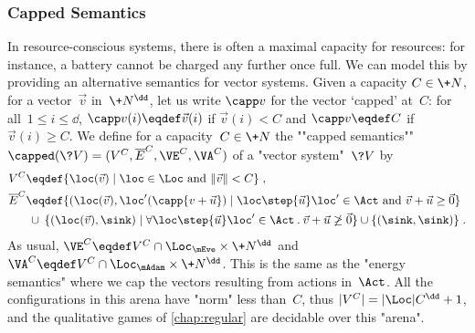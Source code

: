 \subsubsection{Capped Semantics}
\label{12-capping}

In resource-conscious systems, there is often a maximal capacity for
resources: for instance, a battery cannot be charged any further once
full.  We can model this by providing an alternative semantics
for vector systems.  Given a capacity $C\in\+N$, for a vector~$\vec v$
in~$\+N^\dd$, let us write $\capp v$ for the vector `capped' at~$C$:
for all~$1\leq i\leq\dd$, $\capp v(i)\eqdef\vec v(i)$ if $\vec v(i)<C$
and $\capp v\eqdef C$ if $\vec v(i)\geq C$.  We define for a
capacity~$C\in\+N$ the ""capped semantics""
$\capped(\?V)=(V^C,\overline{E}^C,\VE^C,\VA^C)$ of a "vector system"~$\?V$ by
\begin{align*}
  V^C&\eqdef\{\loc(\vec v)\mid\loc\in\Loc\text{ and }\|\vec v\|<C\}\;,\\
  \overline{E}^C&\eqdef \{(\loc(\vec v),\loc'(\capp{v+\vec u})\mid\loc\step{\vec
       u}\loc'\in\Act\text{ and }\vec v+\vec u\geq\vec 0\}\\
     &\:\cup\:\{(\loc(\vec v),\sink)\mid\forall\loc\step{\vec
               u}\loc'\in\Act\mathbin.\vec v+\vec u\not\geq\vec
               0\}
     \cup\{(\sink,\sink)\}\;.
\end{align*}
As usual, $\VE^C\eqdef V^C\cap\Loc_\mEve\times\+N^\dd$ and
$\VA^C\eqdef V^C\cap\Loc_\mAdam\times\+N^\dd$.  This is the same as
the "energy semantics" where we cap the vectors resulting from actions
in~$\Act$.  All the configurations in this arena have "norm" less
than~$C$, thus $|V^C|=|\Loc| C^\dd+1$, and the qualitative games of
\cref{chap:regular} are decidable over this "arena".


